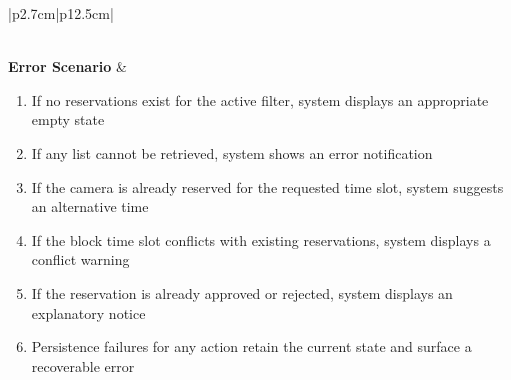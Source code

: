 \begin{table}[H]
\begin{tabular}{|p{2.7cm}|p{12.5cm}|}
\begin{minipage}[t]{\linewidth}
\begin{enumerate}[topsep=0pt,itemsep=1pt,parsep=0pt,partopsep=0pt]
            \end{enumerate}
        \end{minipage} \\
        \hline
        \textbf{Error Scenario} & \begin{minipage}[t]{\linewidth}
            \begin{enumerate}[topsep=0pt,itemsep=1pt,parsep=0pt,partopsep=0pt]
                \item If no reservations exist for the active filter, system displays an appropriate empty state
                \item If any list cannot be retrieved, system shows an error notification
                \item If the camera is already reserved for the requested time slot, system suggests an alternative time
                \item If the block time slot conflicts with existing reservations, system displays a conflict warning
                \item If the reservation is already approved or rejected, system displays an explanatory notice
                \item Persistence failures for any action retain the current state and surface a recoverable error
            \end{enumerate}
        \end{minipage} \\
        \hline
    \end{tabular}
    \label{tab:admin-camera-reservations}
\end{table}


